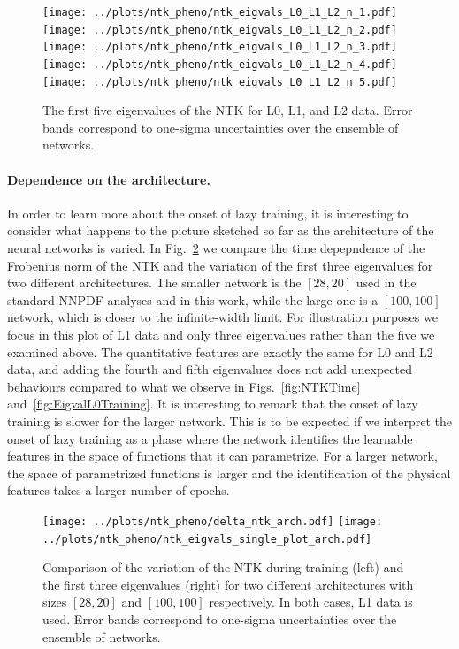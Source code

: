 \begin{figure}[ht!]
  \centering
  \texttt{[image: ../plots/ntk\_pheno/ntk\_eigvals\_L0\_L1\_L2\_n\_1.pdf]}
  \texttt{[image: ../plots/ntk\_pheno/ntk\_eigvals\_L0\_L1\_L2\_n\_2.pdf]}
  \texttt{[image: ../plots/ntk\_pheno/ntk\_eigvals\_L0\_L1\_L2\_n\_3.pdf]}
  \texttt{[image: ../plots/ntk\_pheno/ntk\_eigvals\_L0\_L1\_L2\_n\_4.pdf]}
  \texttt{[image: ../plots/ntk\_pheno/ntk\_eigvals\_L0\_L1\_L2\_n\_5.pdf]}
  \vspace{0.5cm}
  \caption{The first five eigenvalues of the NTK for L0, L1, and L2 data. Error
  bands correspond to one-sigma uncertainties over the ensemble of networks.}
  \label{fig:EigvalsComparison}
\end{figure}

\FloatBarrier

\paragraph{Dependence on the architecture.}
In order to learn more about the onset of lazy training, it is interesting to consider what happens to 
the picture sketched so far as the architecture of the neural networks is varied. In Fig.~\ref{fig:NTKTimeDiffArch}
we compare the time depepndence of the Frobenius norm of the NTK and the variation of the first three eigenvalues
for two different architectures. The smaller network is the $[28,20]$ used in the standard NNPDF
analyses and in this work, while the large one is a $[100,100]$ network, which is closer to the infinite-width
limit. For illustration purposes we focus in this plot of L1 data and only three eigenvalues rather than the five
we examined above. The quantitative features are exactly the same for L0 and L2 data, and adding the fourth 
and fifth eigenvalues does not add unexpected behaviours compared to what we observe in Figs.~\ref{fig:NTKTime} 
and~\ref{fig:EigvalL0Training}. It is interesting to remark that the onset of lazy training is slower 
for the larger network. This is to be expected if we interpret the onset of lazy training as a phase where 
the network identifies the learnable features in the space of functions that it can parametrize. For a 
larger network, the space of parametrized functions is larger and the identification of the physical 
features takes a larger number of epochs. 
\begin{figure}[ht!]
  \centering
  \texttt{[image: ../plots/ntk\_pheno/delta\_ntk\_arch.pdf]}
  \texttt{[image: ../plots/ntk\_pheno/ntk\_eigvals\_single\_plot\_arch.pdf]}
  \caption{Comparison of the variation of the NTK during training (left) and the
  first three eigenvalues (right) for two different architectures with sizes
  $[28,20]$ and $[100,100]$ respectively. In both cases, L1 data is used. Error
  bands correspond to one-sigma uncertainties over the ensemble of networks.}
  \label{fig:NTKTimeDiffArch}
\end{figure}

